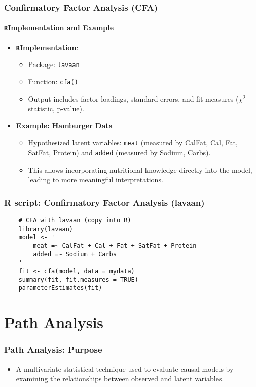 \documentclass{beamer}
\newcommand{\R}{\texttt{R}}
\newcommand{\code}[1]{\texttt{#1}}
\begin{document}
\begin{frame}
    \frametitle{Confirmatory Factor Analysis (CFA)}
    \framesubtitle{\R Implementation and Example}
    \begin{itemize}
        \item \textbf{\R Implementation}:
            \begin{itemize}
                \item Package: \code{lavaan}
                \item Function: \code{cfa()}
                \item Output includes factor loadings, standard errors, and fit measures ($\chi^2$ statistic, p-value).
            \end{itemize}
        \item \textbf{Example: Hamburger Data}
            \begin{itemize}
                \item Hypothesized latent variables: \code{meat} (measured by CalFat, Cal, Fat, SatFat, Protein) and \code{added} (measured by Sodium, Carbs).
                \item This allows incorporating nutritional knowledge directly into the model, leading to more meaningful interpretations.
            \end{itemize}
    \end{itemize}
\end{frame}

    \begin{frame}[fragile]
            \frametitle{R script: Confirmatory Factor Analysis (lavaan)}
            \begin{verbatim}
    # CFA with lavaan (copy into R)
    library(lavaan)
    model <- '
        meat =~ CalFat + Cal + Fat + SatFat + Protein
        added =~ Sodium + Carbs
    '
    fit <- cfa(model, data = mydata)
    summary(fit, fit.measures = TRUE)
    parameterEstimates(fit)
            \end{verbatim}
    \end{frame}

\section{Path Analysis}

\begin{frame}
    \frametitle{Path Analysis: Purpose}
    \begin{itemize}
        \item A multivariate statistical technique used to evaluate \alert{causal models} by examining the relationships between observed and latent variables.
    \end{itemize}
\end{frame}
\end{document}
